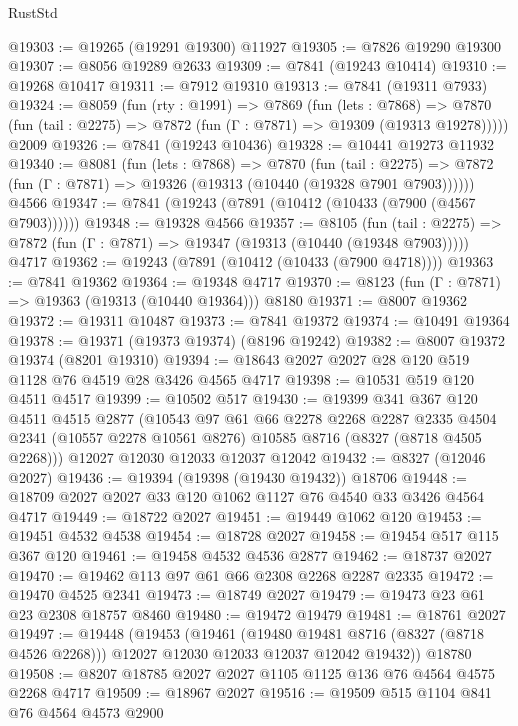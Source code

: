 \begin{lexlean}{RustStd}
\begin{coremodule}
@19303 := @19265 (@19291 @19300) @11927
@19305 := @7826 @19290 @19300
@19307 := @8056 @19289 @2633
@19309 := @7841 (@19243 @10414)
@19310 := @19268 @10417
@19311 := @7912 @19310
@19313 := @7841 (@19311 @7933)
@19324 := @8059
    (fun (rty : @1991) =>
    @7869
      (fun (lets : @7868) =>
      @7870 (fun (tail : @2275) => @7872 (fun (Γ : @7871) => @19309 (@19313 @19278)))))
    @2009
@19326 := @7841 (@19243 @10436)
@19328 := @10441 @19273 @11932
@19340 := @8081
    (fun (lets : @7868) =>
    @7870
      (fun (tail : @2275) =>
      @7872 (fun (Γ : @7871) => @19326 (@19313 (@10440 (@19328 @7901 @7903))))))
    @4566
@19347 := @7841 (@19243 (@7891 (@10412 (@10433 (@7900 (@4567 @7903))))))
@19348 := @19328 @4566
@19357 := @8105
    (fun (tail : @2275) => @7872 (fun (Γ : @7871) => @19347 (@19313 (@10440 (@19348 @7903)))))
    @4717
@19362 := @19243 (@7891 (@10412 (@10433 (@7900 @4718))))
@19363 := @7841 @19362
@19364 := @19348 @4717
@19370 := @8123 (fun (Γ : @7871) => @19363 (@19313 (@10440 @19364))) @8180
@19371 := @8007 @19362
@19372 := @19311 @10487
@19373 := @7841 @19372
@19374 := @10491 @19364
@19378 := @19371 (@19373 @19374) (@8196 @19242)
@19382 := @8007 @19372 @19374 (@8201 @19310)
@19394 := @18643 @2027 @2027 @28 @120 @519 @1128 @76 @4519 @28 @3426 @4565 @4717
@19398 := @10531 @519 @120 @4511 @4517
@19399 := @10502 @517
@19430 := @19399
    @341
    @367
    @120
    @4511
    @4515
    @2877
    (@10543
      @97
      @61
      @66
      @2278
      @2268
      @2287
      @2335
      @4504
      @2341
      (@10557 @2278 @10561 @8276)
      @10585
      @8716
      (@8327 (@8718 @4505 @2268)))
    @12027
    @12030
    @12033
    @12037
    @12042
@19432 := @8327 (@12046 @2027)
@19436 := @19394 (@19398 (@19430 @19432)) @18706
@19448 := @18709 @2027 @2027 @33 @120 @1062 @1127 @76 @4540 @33 @3426 @4564 @4717
@19449 := @18722 @2027
@19451 := @19449 @1062 @120
@19453 := @19451 @4532 @4538
@19454 := @18728 @2027
@19458 := @19454 @517 @115 @367 @120
@19461 := @19458 @4532 @4536 @2877
@19462 := @18737 @2027
@19470 := @19462 @113 @97 @61 @66 @2308 @2268 @2287 @2335
@19472 := @19470 @4525 @2341
@19473 := @18749 @2027
@19479 := @19473 @23 @61 @23 @2308 @18757 @8460
@19480 := @19472 @19479
@19481 := @18761 @2027
@19497 := @19448
    (@19453
      (@19461
        (@19480 @19481 @8716 (@8327 (@8718 @4526 @2268)))
        @12027
        @12030
        @12033
        @12037
        @12042
        @19432))
    @18780
@19508 := @8207 @18785 @2027 @2027 @1105 @1125 @136 @76 @4564 @4575 @2268 @4717
@19509 := @18967 @2027
@19516 := @19509 @515 @1104 @841 @76 @4564 @4573 @2900

\end{coremodule}
\end{lexlean}
